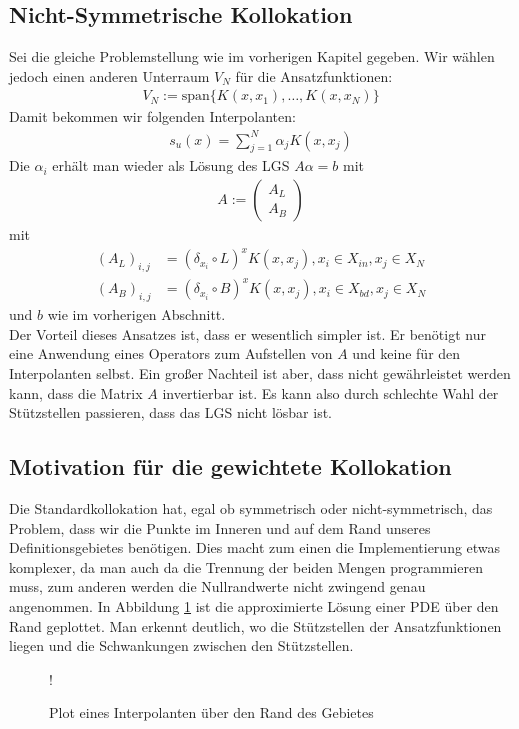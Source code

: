 \subsection{Nicht-Symmetrische Kollokation}
Sei die gleiche Problemstellung wie im vorherigen Kapitel gegeben. Wir wählen jedoch einen anderen Unterraum $V_N$ für die Ansatzfunktionen:
\begin{align*}
V_N := \text{span} \{K(x,x_1), \dots, K(x,x_N) \}
\end{align*}
Damit bekommen wir folgenden Interpolanten:
\begin{align*}
s_u(x) = \sum_{j=1}^N \alpha_j K(x,x_j)
\end{align*}
Die $\alpha_i$ erhält man wieder als Lösung des \ac{LGS} $A \alpha = b$ mit
\begin{align*}
A := \begin{pmatrix}
A_L \\ 
A_B
\end{pmatrix} 
\end{align*}
mit
\begin{align*}
(A_L)_{i,j} &= (\delta_{x_i} \circ L)^x K(x,x_j), x_i \in X_{in}, x_j \in X_N\\
(A_B)_{i,j} &= (\delta_{x_i} \circ B)^x K(x,x_j), x_i \in X_{bd}, x_j \in X_N
\end{align*}
und
$b$ wie im vorherigen Abschnitt.\\
Der Vorteil dieses Ansatzes ist, dass er wesentlich simpler ist. Er benötigt nur eine Anwendung eines Operators zum Aufstellen von $A$ und keine für den Interpolanten selbst. Ein großer Nachteil ist aber, dass nicht gewährleistet werden kann, dass die Matrix $A$ invertierbar ist. Es kann also durch schlechte Wahl der Stützstellen passieren, dass das \ac{LGS} nicht lösbar ist.
\subsection{Motivation für die gewichtete Kollokation}
Die Standardkollokation hat, egal ob symmetrisch oder nicht-symmetrisch, das Problem, dass wir die Punkte im Inneren und auf dem Rand unseres Definitionsgebietes benötigen. Dies macht zum einen die Implementierung etwas komplexer, da man auch da die Trennung der beiden Mengen programmieren muss, zum anderen werden die Nullrandwerte nicht zwingend genau angenommen. In Abbildung \ref{fig:rand} ist die approximierte Lösung einer \ac{PDE} über den Rand geplottet. Man erkennt deutlich, wo die Stützstellen der Ansatzfunktionen liegen und die Schwankungen zwischen den Stützstellen.
\begin{figure}[h]
\centering
\resizebox {\columnwidth} {!} {

}
\caption{Plot eines Interpolanten über den Rand des Gebietes}
\label{fig:rand}
\end{figure}
